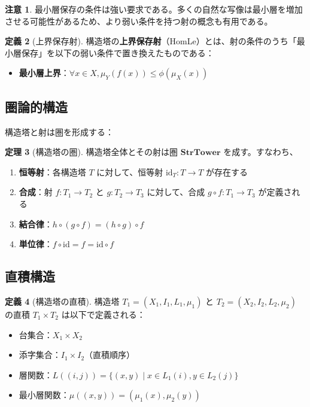 \documentclass[a4paper,12pt]{ltjsarticle}
\theoremstyle{definition}
\newtheorem{definition}{定義}[section]
\newtheorem{theorem}[definition]{定理}
\newtheorem{remark}[definition]{注意}
\begin{document}
\begin{remark}
最小層保存の条件は強い要求である。多くの自然な写像は最小層を増加させる可能性があるため、より弱い条件を持つ射の概念も有用である。
\end{remark}

\begin{definition}[上界保存射]
\label{def:homle}
構造塔の\textbf{上界保存射}（HomLe）とは、射の条件のうち「最小層保存」を以下の弱い条件で置き換えたものである：

\begin{itemize}
\item \textbf{最小層上界}：$\forall x \in X, \mu_Y(f(x)) \leq \phi(\mu_X(x))$
\end{itemize}
\end{definition}

\subsection{圏論的構造}

構造塔と射は圏を形成する：

\begin{theorem}[構造塔の圏]
\label{thm:category}
構造塔全体とその射は圏 $\mathbf{StrTower}$ を成す。すなわち、
\begin{enumerate}
\item \textbf{恒等射}：各構造塔 $T$ に対して、恒等射 $\mathrm{id}_T : T \to T$ が存在する
\item \textbf{合成}：射 $f : T_1 \to T_2$ と $g : T_2 \to T_3$ に対して、合成 $g \circ f : T_1 \to T_3$ が定義される
\item \textbf{結合律}：$h \circ (g \circ f) = (h \circ g) \circ f$
\item \textbf{単位律}：$f \circ \mathrm{id} = f = \mathrm{id} \circ f$
\end{enumerate}
\end{theorem}

\subsection{直積構造}

\begin{definition}[構造塔の直積]
\label{def:product}
構造塔 $T_1 = (X_1, I_1, L_1, \mu_1)$ と $T_2 = (X_2, I_2, L_2, \mu_2)$ の直積 $T_1 \times T_2$ は以下で定義される：
\begin{itemize}
\item 台集合：$X_1 \times X_2$
\item 添字集合：$I_1 \times I_2$（直積順序）
\item 層関数：$L((i, j)) = \{(x, y) \mid x \in L_1(i), y \in L_2(j)\}$
\item 最小層関数：$\mu((x, y)) = (\mu_1(x), \mu_2(y))$
\end{itemize}
\end{definition}
\end{document}
